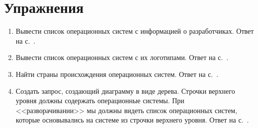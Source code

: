 \section{Упражнения}
\label{tasks:operating_system_tasks}
\begin{enumerate}
	\item Вывести список операционных систем с информацией о разработчиках. Ответ на с.~\pageref{answer:os_and_developers}.
	\item Вывести список операционных систем с их логотипами. Ответ на с.~\pageref{answer:os_and_logos}.
	\item Найти страны происхождения операционных систем. Ответ на с.~\pageref{answer:os_country}.
	\item Создать запрос, создающий диаграмму в виде дерева. 
        Строчки верхнего уровня должны содержать операционные системы. 
        При <<разворачивании>> мы должны видеть список операционных систем, 
        которые основывались на системе из строчки верхнего уровня. 
        Ответ на с.~\pageref{answer:os_and_bases}.
\end{enumerate}
